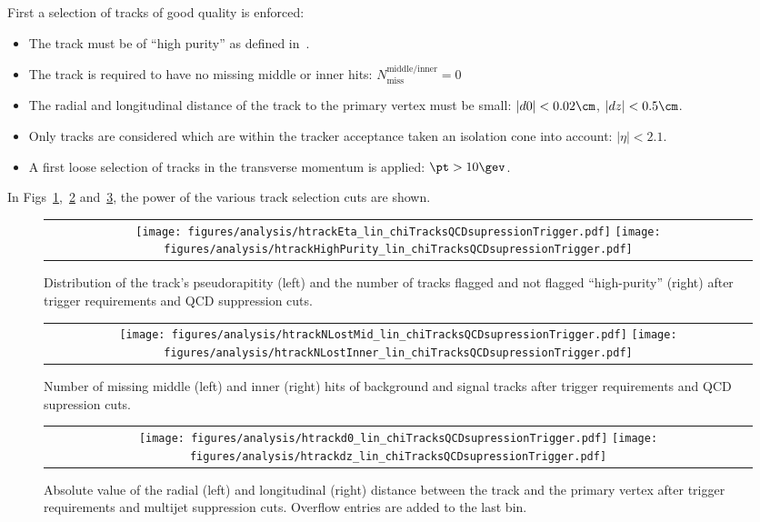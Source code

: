 First a selection of tracks of good quality is enforced:
\begin{itemize}
\renewcommand{\labelitemi}{\footnotesize{\ding{118}}}
\item The track must be of ``high purity'' as defined in~\cite{bib:CMS:Tracking_2010}.
\item The track is required to have no missing middle or inner hits: $N_{\text{miss}}^{\text{middle/inner}}=0$
\item The radial and longitudinal  distance of the track to the primary vertex must be small: \mbox{$|d0|<0.02\cm$}, \mbox{$|dz|<0.5\cm$}.
\item Only tracks are considered which are within the tracker acceptance taken an isolation cone into account: $|\eta|<2.1$.
\item A first loose selection of tracks in the transverse momentum is applied: \mbox{$\pt>10\gev$}.
\end{itemize}
In Figs~\ref{fig:Eta_HighPurity},~\ref{fig:LostHits} and~\ref{fig:d0_dz}, the power of the various track selection cuts are shown.\\
\begin{figure}[!t]
  \centering 
  \begin{tabular}{c}
    \texttt{[image: figures/analysis/htrackEta\_lin\_chiTracksQCDsupressionTrigger.pdf]}
    \texttt{[image: figures/analysis/htrackHighPurity\_lin\_chiTracksQCDsupressionTrigger.pdf]}
  \end{tabular}
  \caption{Distribution of the track's pseudorapitity (left) and the number of tracks flagged and not flagged ``high-purity'' (right) after trigger requirements and QCD suppression cuts.}
  \label{fig:Eta_HighPurity}
\end{figure}
\begin{figure}[!t]
  \centering 
  \begin{tabular}{c}
    \texttt{[image: figures/analysis/htrackNLostMid\_lin\_chiTracksQCDsupressionTrigger.pdf]}
    \texttt{[image: figures/analysis/htrackNLostInner\_lin\_chiTracksQCDsupressionTrigger.pdf]}
  \end{tabular}
  \caption{Number of missing middle (left) and inner (right) hits of background and signal tracks after trigger requirements and QCD supression cuts.}
  \label{fig:LostHits}
\end{figure}
\begin{figure}[!t]
  \centering 
  \begin{tabular}{c}
    \texttt{[image: figures/analysis/htrackd0\_lin\_chiTracksQCDsupressionTrigger.pdf]}
    \texttt{[image: figures/analysis/htrackdz\_lin\_chiTracksQCDsupressionTrigger.pdf]}
  \end{tabular}
  \caption{Absolute value of the radial (left) and longitudinal (right) distance between the track and the primary vertex after trigger requirements and multijet suppression cuts. 
           Overflow entries are added to the last bin.}
  \label{fig:d0_dz}
\end{figure}

